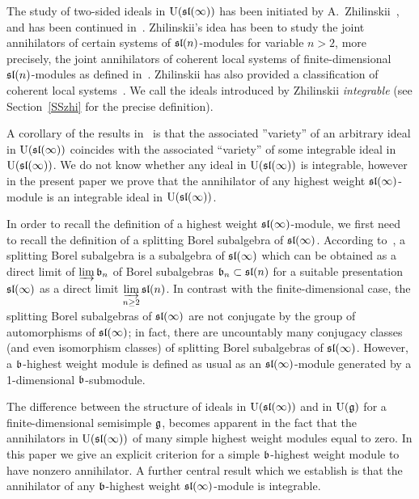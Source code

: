 \documentclass[10pt]{amsart}\oddsidemargin -1mm \evensidemargin -1mm \topmargin -15mm\headheight5mm \headsep 3.5mm \textheight 245mm\textwidth 170mm %
\theoremstyle{definition}\newtheorem{theorem}{Theorem}[section]\newtheorem{lemma}[theorem]{Lemma}\newtheorem{remark}[theorem]{Remark}\newtheorem{proposition}[theorem]{Proposition}\newtheorem{corollary}[theorem]{Corollary}\newtheorem{definition}[theorem]{Definition}\newtheorem{Ex}[theorem]{Example}
\begin{document}
The study of two-sided ideals in $\operatorname{\mathrm{U}}(\frak{sl}(\infty))$ has been initiated by A.~Zhilinskii~\cite{Zh1, Zh2, Zh3}, and has been continued in~\cite{PP}. Zhilinskii's idea has been to study the joint annihilators of certain systems of $\frak{sl}(n)$-modules for variable $n>2$, more precisely, the joint annihilators of coherent local systems of finite-dimensional $\frak{sl}(n)$-modules as defined in~\cite{Zh1}. Zhilinskii has also provided a classification of coherent local systems~\cite{Zh1, Zh2}. We call the ideals introduced by Zhilinskii {\it integrable} (see Section~\ref{SSzhi} for the precise definition).

A corollary of the results in~\cite{PP} is that the associated ''variety'' of an arbitrary ideal in $\operatorname{\mathrm{U}}(\frak{sl}(\infty))$ coincides with the associated ``variety'' of some integrable ideal in $\operatorname{\mathrm{U}}(\frak{sl}(\infty))$.
We do not know whether any ideal in $\operatorname{\mathrm{U}}(\frak{sl}(\infty))$ is integrable, however in the present paper we prove that the annihilator of any highest weight $\frak{sl}(\infty)$-module is an integrable ideal in $\operatorname{\mathrm{U}}(\frak{sl}(\infty))$.

In order to recall the definition of a highest weight $\frak{sl}(\infty)$-module, we first need to recall the definition of a splitting Borel subalgebra of $\frak{sl}(\infty)$. According to~\cite{DP}, a splitting Borel subalgebra is a subalgebra of $\frak{sl}(\infty)$ which can be obtained as a direct limit of $\varinjlim\frak b_n$ of Borel subalgebras $\frak b_n\subset\frak{sl}(n)$ for a suitable presentation $\frak{sl}(\infty)$ as a direct limit $\varinjlim\limits_{n\ge 2}\frak{sl}(n)$. In contrast with the finite-dimensional case, the splitting Borel subalgebras of $\frak{sl}(\infty)$ are not conjugate by the group of automorphisms of $\frak{sl}(\infty)$; in fact, there are uncountably many conjugacy classes (and even isomorphism classes) of splitting Borel subalgebras of  $\frak{sl}(\infty)$. However, a $\frak b$-highest weight module is defined as usual as an $\frak{sl}(\infty)$-module generated by a 1-dimensional $\frak b$-submodule.

The difference between the structure of ideals in $\operatorname{\mathrm{U}}(\frak{sl}(\infty))$ and in $\operatorname{\mathrm{U}}(\frak g)$ for a finite-dimensional semisimple $\frak g$, becomes apparent in the fact that the annihilators in $\operatorname{\mathrm{U}}(\frak{sl}(\infty))$ of many simple highest weight modules equal to zero. In this paper we give an explicit criterion for a simple $\frak b$-highest weight module to have nonzero annihilator. A further central result which we establish is that the annihilator of any $\frak b$-highest weight $\frak{sl}(\infty)$-module is integrable.
\end{document}
